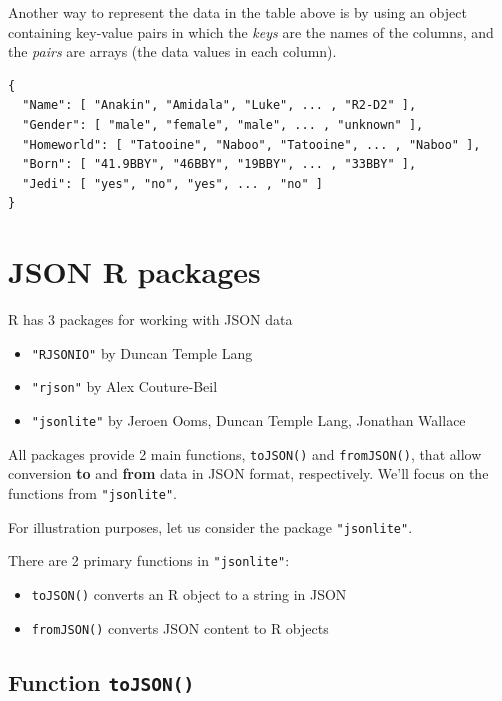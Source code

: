 \documentclass[
]{book}
\begin{document}
Another way to represent the data in the table above is by using an object
containing key-value pairs in which the \emph{keys} are the names of the columns,
and the \emph{pairs} are arrays (the data values in each column).

\begin{verbatim}
{
  "Name": [ "Anakin", "Amidala", "Luke", ... , "R2-D2" ],
  "Gender": [ "male", "female", "male", ... , "unknown" ],
  "Homeworld": [ "Tatooine", "Naboo", "Tatooine", ... , "Naboo" ],
  "Born": [ "41.9BBY", "46BBY", "19BBY", ... , "33BBY" ],
  "Jedi": [ "yes", "no", "yes", ... , "no" ] 
}
\end{verbatim}

\hypertarget{jsonlite}{%
\chapter{JSON R packages}\label{jsonlite}}

R has 3 packages for working with JSON data

\begin{itemize}
\item
  \texttt{"RJSONIO"} by Duncan Temple Lang
\item
  \texttt{"rjson"} by Alex Couture-Beil
\item
  \texttt{"jsonlite"} by Jeroen Ooms, Duncan Temple Lang, Jonathan Wallace
\end{itemize}

All packages provide 2 main functions, \texttt{toJSON()} and \texttt{fromJSON()}, that allow
conversion \textbf{to} and \textbf{from} data in JSON format, respectively.
We'll focus on the functions from \texttt{"jsonlite"}.

For illustration purposes, let us consider the package \texttt{"jsonlite"}.

There are 2 primary functions in \texttt{"jsonlite"}:

\begin{itemize}
\item
  \texttt{toJSON()} converts an R object to a string in JSON
\item
  \texttt{fromJSON()} converts JSON content to R objects
\end{itemize}

\hypertarget{function-tojson}{%
\section{\texorpdfstring{Function \texttt{toJSON()}}{Function toJSON()}}\label{function-tojson}}
\end{document}
